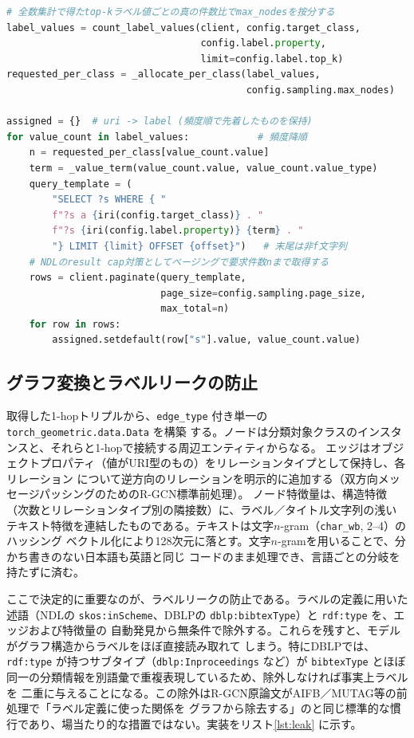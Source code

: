 \documentclass[dvipdfmx,twoside,11pt]{article}
\begin{document}
\begin{lstlisting}[language=Python, caption={ラベル値ごとの層化抽出（\texttt{rdf2graph/convert/labels.py}）。全数集計の真の比率で按分し，層ごとにページングで取得する。}, label={lst:strat}]
# 全数集計で得たtop-kラベル値ごとの真の件数比でmax_nodesを按分する
label_values = count_label_values(client, config.target_class,
                                  config.label.property,
                                  limit=config.label.top_k)
requested_per_class = _allocate_per_class(label_values,
                                          config.sampling.max_nodes)

assigned = {}  # uri -> label (頻度順で先着したものを保持)
for value_count in label_values:            # 頻度降順
    n = requested_per_class[value_count.value]
    term = _value_term(value_count.value, value_count.value_type)
    query_template = (
        "SELECT ?s WHERE { "
        f"?s a {iri(config.target_class)} . "
        f"?s {iri(config.label.property)} {term} . "
        "} LIMIT {limit} OFFSET {offset}")   # 末尾は非f文字列
    # NDLのresult cap対策としてページングで要求件数nまで取得する
    rows = client.paginate(query_template,
                           page_size=config.sampling.page_size,
                           max_total=n)
    for row in rows:
        assigned.setdefault(row["s"].value, value_count.value)
\end{lstlisting}

\subsection{グラフ変換とラベルリークの防止}

取得した1-hopトリプルから、\texttt{edge\_type} 付き単一の \texttt{torch\_geometric.data.Data} を構築
する。ノードは分類対象クラスのインスタンスと、それらと1-hopで接続する周辺エンティティからなる。
エッジはオブジェクトプロパティ（値がURI型のもの）をリレーションタイプとして保持し、各リレーション
について逆方向のリレーションを明示的に追加する（双方向メッセージパッシングのためのR-GCN標準前処理）。
ノード特徴量は、構造特徴（次数とリレーションタイプ別の隣接数）に、ラベル／タイトル文字列の浅い
テキスト特徴を連結したものである。テキストは文字$n$-gram（\texttt{char\_wb}, 2--4）のハッシング
ベクトル化により128次元に落とす。文字$n$-gramを用いることで、分かち書きのない日本語も英語と同じ
コードのまま処理でき、言語ごとの分岐を持たずに済む。

ここで決定的に重要なのが、ラベルリークの防止である。ラベルの定義に用いた述語（NDLの
\texttt{skos:inScheme}、DBLPの \texttt{dblp:bibtexType}）と \texttt{rdf:type} を、エッジおよび特徴量の
自動発見から無条件で除外する。これらを残すと、モデルがグラフ構造からラベルをほぼ直接読み取れて
しまう。特にDBLPでは、\texttt{rdf:type} が持つサブタイプ（\texttt{dblp:Inproceedings} など）が
\texttt{bibtexType} とほぼ同一の分類情報を別語彙で重複表現しているため、除外しなければ事実上ラベルを
二重に与えることになる。この除外はR-GCN原論文がAIFB／MUTAG等の前処理で「ラベル定義に使った関係を
グラフから除去する」のと同じ標準的な慣行であり、場当たり的な措置ではない。実装をリスト\ref{lst:leak}
に示す。
\end{document}
